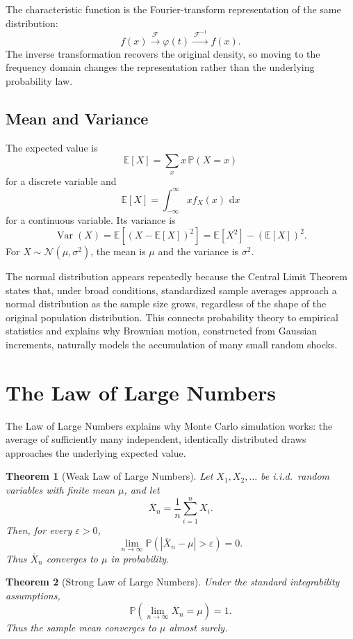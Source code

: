 \documentclass[12pt,openany]{book}
\newtheorem{theorem}{Theorem}[section]
\theoremstyle{definition}
\theoremstyle{remark}
\newcommand{\E}{\mathbb{E}}
\newcommand{\Prob}{\mathbb{P}}
\newcommand{\dd}{\,\mathrm{d}}
\DeclareMathOperator{\Var}{Var}
\begin{document}
The characteristic function is the Fourier-transform representation of the
same distribution:
\[
f(x)\xrightarrow{\ \mathcal{F}\ }\varphi(t)
\xrightarrow{\ \mathcal{F}^{-1}\ }f(x).
\]
The inverse transformation recovers the original density, so moving to the
frequency domain changes the representation rather than the underlying
probability law.

\subsection{Mean and Variance}

The expected value is
\[
\E[X]=\sum_x x\,\Prob(X=x)
\]
for a discrete variable and
\[
\E[X]=\int_{-\infty}^{\infty}x f_X(x)\,\dd x
\]
for a continuous variable. Its variance is
\[
\Var(X)=\E[(X-\E[X])^2]=\E[X^2]-(\E[X])^2.
\]
For \(X\sim\mathcal{N}(\mu,\sigma^2)\), the mean is \(\mu\) and the
variance is \(\sigma^2\).

The normal distribution appears repeatedly because the Central Limit
Theorem states that, under broad conditions, standardized sample averages
approach a normal distribution as the sample size grows, regardless of the
shape of the original population distribution. This connects probability
theory to empirical statistics and explains why Brownian motion, constructed
from Gaussian increments, naturally models the accumulation of many small
random shocks.

\section{The Law of Large Numbers}

The Law of Large Numbers explains why Monte Carlo simulation works: the
average of sufficiently many independent, identically distributed draws
approaches the underlying expected value.

\begin{theorem}[Weak Law of Large Numbers]
Let \(X_1,X_2,\ldots\) be i.i.d.\ random variables with finite mean
\(\mu\), and let
\[
\overline{X}_n=\frac1n\sum_{i=1}^{n}X_i.
\]
Then, for every \(\varepsilon>0\),
\[
\lim_{n\to\infty}
\Prob\!\left(\left|\overline{X}_n-\mu\right|>\varepsilon\right)
=0.
\]
Thus \(\overline{X}_n\) converges to \(\mu\) in probability.
\end{theorem}

\begin{theorem}[Strong Law of Large Numbers]
Under the standard integrability assumptions,
\[
\Prob\!\left(
\lim_{n\to\infty}\overline{X}_n=\mu
\right)=1.
\]
Thus the sample mean converges to \(\mu\) almost surely.
\end{theorem}
\end{document}
